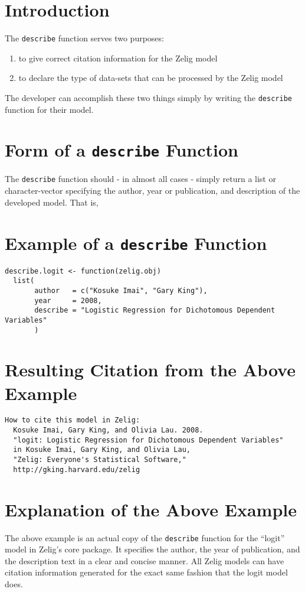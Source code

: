 \section{Introduction}
The {\tt describe} function serves two purposes:

\begin{enumerate}
	\item{to give correct citation information for the Zelig model}
	\item{to declare the type of data-sets that can be processed by the Zelig model}
\end{enumerate}

The developer can accomplish these two things simply by writing the {\tt describe} function for their model.

\section{Form of a {\tt describe} Function}
The {\tt describe} function should - in almost all cases - simply return a list or character-vector specifying the author, year or publication, and description of the developed model.  That is, 

\section{Example of a {\tt describe} Function}
\begin{verbatim}
describe.logit <- function(zelig.obj)
  list(
       author   = c("Kosuke Imai", "Gary King"),
       year     = 2008,
       describe = "Logistic Regression for Dichotomous Dependent Variables"
       )
\end{verbatim}

\section{Resulting Citation from the Above Example}
\begin{verbatim}
How to cite this model in Zelig:
  Kosuke Imai, Gary King, and Olivia Lau. 2008.
  "logit: Logistic Regression for Dichotomous Dependent Variables"
  in Kosuke Imai, Gary King, and Olivia Lau,
  "Zelig: Everyone's Statistical Software,"
  http://gking.harvard.edu/zelig
\end{verbatim}

\section{Explanation of the Above Example}
The above example is an actual copy of the {\tt describe} function for the ``logit'' model in Zelig's core package.  It specifies the author, the year of publication, and the description text in a clear and concise manner.  All Zelig models can have citation information generated for the exact same fashion that the logit model does.